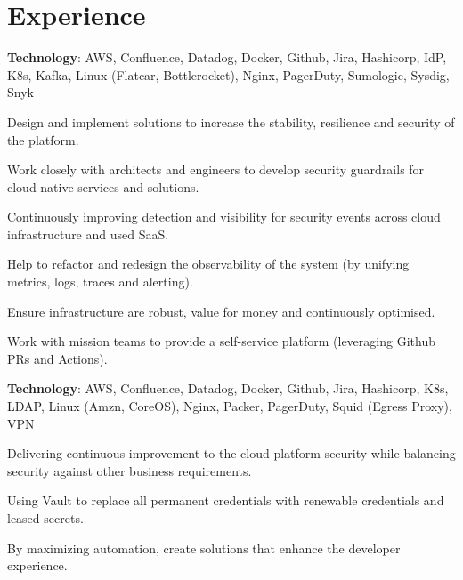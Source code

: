 \documentclass[]{cv}
\begin{document}
\begin{minipage}[t]{0.70\textwidth}

\section{Experience}\label{sec:experience}
\sectionsep
\textbf{Technology}: AWS, Confluence, Datadog, Docker, Github, Jira, Hashicorp, IdP, K8s, Kafka, Linux (Flatcar, Bottlerocket), Nginx, PagerDuty, Sumologic, Sysdig, Snyk
\sectionsep
\begin{tightemize}
\item Design and implement solutions to increase the stability, resilience and security of the platform.
\item Work closely with architects and engineers to develop security guardrails for cloud native services and solutions.
\item Continuously improving detection and visibility for security events across cloud infrastructure and used SaaS.
\item Help to refactor and redesign the observability of the system (by unifying metrics, logs, traces and alerting).
\item Ensure infrastructure are robust, value for money and continuously optimised.
\item Work with mission teams to provide a self-service platform (leveraging Github PRs and Actions).
\end{tightemize}
\sectionsep
\sectionsep
{}
\sectionsep
\textbf{Technology}: AWS, Confluence, Datadog, Docker, Github, Jira, Hashicorp, K8s, LDAP, Linux (Amzn, CoreOS), Nginx, Packer, PagerDuty, Squid (Egress Proxy), VPN
\sectionsep
\begin{tightemize}
\item Delivering continuous improvement to the cloud platform security while balancing security against other business requirements.
\item Using Vault to replace all permanent credentials with renewable credentials and leased secrets.
\item By maximizing automation, create solutions that enhance the developer experience.

\end{tightemize}
\end{minipage}
\end{document}

